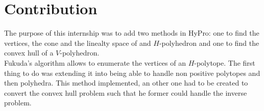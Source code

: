 \section{Contribution}
The purpose of this internship was to add two methods in HyPro: one to find the vertices, the cone and the linealty space of and $H$-polyhedron and one to find the convex hull of a $V$-polyhedron.\\
Fukuda's algorithm allows to enumerate the vertices of an $H$-polytope. The first thing to do was extending it into being able to handle non positive polytopes and then polyhedra. This method implemented, an other one had to be created to convert the convex hull problem such that he former could handle the inverse problem.


